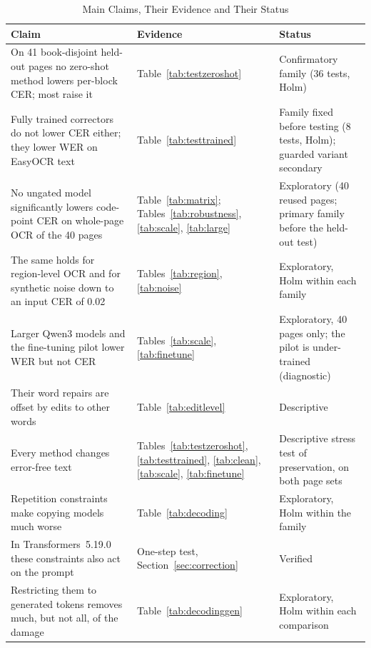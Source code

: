 \begin{table}[t]
\centering
\caption{Main Claims, Their Evidence and Their Status}
\label{tab:claims}
\setlength{\tabcolsep}{3.5pt}
\footnotesize
\renewcommand{\arraystretch}{1.12}
\begin{tabular}{>{\raggedright\arraybackslash}p{7.4cm}>{\raggedright\arraybackslash}p{4.6cm}>{\raggedright\arraybackslash}p{5.2cm}}
\toprule
Claim & Evidence & Status \\
\midrule
On 41 book-disjoint held-out pages no zero-shot method lowers per-block CER; most raise it & Table~\ref{tab:testzeroshot} & Confirmatory family (36 tests, Holm) \\
Fully trained correctors do not lower CER either; they lower WER on EasyOCR text & Table~\ref{tab:testtrained} & Family fixed before testing (8 tests, Holm); guarded variant secondary \\
No ungated model significantly lowers code-point CER on whole-page OCR of the 40 pages & Table~\ref{tab:matrix}; Tables~\ref{tab:robustness}, \ref{tab:scale}, \ref{tab:large} & Exploratory (40 reused pages; primary family before the held-out test) \\
The same holds for region-level OCR and for synthetic noise down to an input CER of 0.02 & Tables~\ref{tab:region}, \ref{tab:noise} & Exploratory, Holm within each family \\
Larger Qwen3 models and the fine-tuning pilot lower WER but not CER & Tables~\ref{tab:scale}, \ref{tab:finetune} & Exploratory, 40 pages only; the pilot is under-trained (diagnostic) \\
Their word repairs are offset by edits to other words & Table~\ref{tab:editlevel} & Descriptive \\
Every method changes error-free text & Tables~\ref{tab:testzeroshot}, \ref{tab:testtrained}, \ref{tab:clean}, \ref{tab:scale}, \ref{tab:finetune} & Descriptive stress test of preservation, on both page sets \\
Repetition constraints make copying models much worse & Table~\ref{tab:decoding} & Exploratory, Holm within the family \\
In Transformers~5.19.0 these constraints also act on the prompt & One-step test, Section~\ref{sec:correction} & Verified \\
Restricting them to generated tokens removes much, but not all, of the damage & Table~\ref{tab:decodinggen} & Exploratory, Holm within each comparison \\

\end{tabular}
\end{table}
